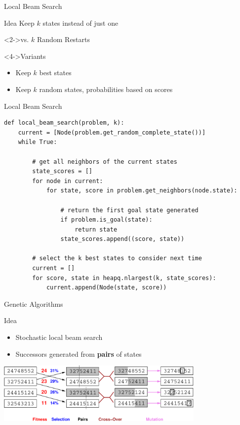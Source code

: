 \documentclass[14pt]{beamer}
\begin{document}
\begin{frame}{Local Beam Search}
\begin{block}{Idea}
Keep $k$ states instead of just one
\end{block}
\begin{block}<2->{vs. $k$ Random Restarts}
\end{block}
\begin{block}<4->{Variants}
\begin{itemize}
\item<5-> Keep $k$ best states
\item<6-> Keep $k$ random states, probabilities based on scores
\end{itemize}
\end{block}
\end{frame}


\begin{frame}[fragile]{Local Beam Search}
\scriptsize
\begin{lstlisting}
def local_beam_search(problem, k):
    current = [Node(problem.get_random_complete_state())]
    while True:

        # get all neighbors of the current states
        state_scores = []
        for node in current:
            for state, score in problem.get_neighbors(node.state):

                # return the first goal state generated
                if problem.is_goal(state):
                    return state
                state_scores.append((score, state))

        # select the k best states to consider next time
        current = []
        for score, state in heapq.nlargest(k, state_scores):
            current.append(Node(state, score))
\end{lstlisting}
\end{frame}


\begin{frame}{Genetic Algorithms}
\begin{block}{Idea}
\begin{itemize}
\item Stochastic local beam search
\item Successors generated from \textbf{pairs} of states
\end{itemize}
\end{block}
\begin{center}
\includegraphics[width=4in]{genetic.pdf}
\end{center}
\end{frame}
\end{document}
